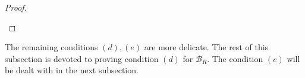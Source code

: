 \documentclass[10pt]{article}
\numberwithin{equation}{section}
\newcommand{\calB}{{\mathcal B}}
\newcommand{\calO}{{\mathcal O}}
\newcommand{\calR}{{\mathcal R}}
\newcommand{\Spec}{{\mathrm{Spec}}}         %
\begin{document}
\begin{proof}
\begin{enumerate}
    


    
\end{enumerate}

\end{proof}

The remaining conditions $(d),(e)$ are more delicate. The rest of this subsection is devoted to proving condition $(d)$ for $\calB_R$. The condition $(e)$ will be dealt with in the next subsection.
\end{document}
